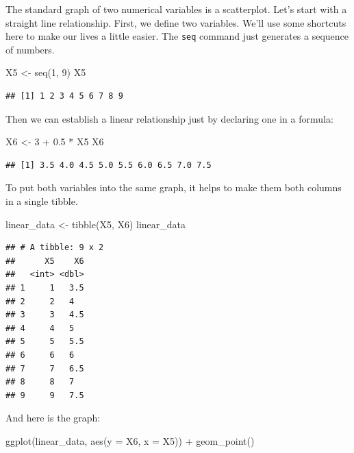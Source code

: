 \documentclass[
]{book}
\newenvironment{Shaded}{\begin{snugshade}}{\end{snugshade}}
\newcommand{\AttributeTok}[1]{\textcolor[rgb]{0.77,0.63,0.00}{#1}}
\newcommand{\DecValTok}[1]{\textcolor[rgb]{0.00,0.00,0.81}{#1}}
\newcommand{\FloatTok}[1]{\textcolor[rgb]{0.00,0.00,0.81}{#1}}
\newcommand{\FunctionTok}[1]{\textcolor[rgb]{0.00,0.00,0.00}{#1}}
\newcommand{\NormalTok}[1]{#1}
\newcommand{\OtherTok}[1]{\textcolor[rgb]{0.56,0.35,0.01}{#1}}
\newcommand{\SpecialCharTok}[1]{\textcolor[rgb]{0.00,0.00,0.00}{#1}}
\begin{document}
The standard graph of two numerical variables is a scatterplot. Let's start with a straight line relationship. First, we define two variables. We'll use some shortcuts here to make our lives a little easier. The \texttt{seq} command just generates a sequence of numbers.

\begin{Shaded}
\begin{Highlighting}[]
\NormalTok{X5 }\OtherTok{\textless{}{-}} \FunctionTok{seq}\NormalTok{(}\DecValTok{1}\NormalTok{, }\DecValTok{9}\NormalTok{)}
\NormalTok{X5}
\end{Highlighting}
\end{Shaded}

\begin{verbatim}
## [1] 1 2 3 4 5 6 7 8 9
\end{verbatim}

Then we can establish a linear relationship just by declaring one in a formula:

\begin{Shaded}
\begin{Highlighting}[]
\NormalTok{X6 }\OtherTok{\textless{}{-}} \DecValTok{3} \SpecialCharTok{+} \FloatTok{0.5} \SpecialCharTok{*}\NormalTok{ X5}
\NormalTok{X6}
\end{Highlighting}
\end{Shaded}

\begin{verbatim}
## [1] 3.5 4.0 4.5 5.0 5.5 6.0 6.5 7.0 7.5
\end{verbatim}

To put both variables into the same graph, it helps to make them both columns in a single tibble.

\begin{Shaded}
\begin{Highlighting}[]
\NormalTok{linear\_data }\OtherTok{\textless{}{-}} \FunctionTok{tibble}\NormalTok{(X5, X6)}
\NormalTok{linear\_data}
\end{Highlighting}
\end{Shaded}

\begin{verbatim}
## # A tibble: 9 x 2
##      X5    X6
##   <int> <dbl>
## 1     1   3.5
## 2     2   4  
## 3     3   4.5
## 4     4   5  
## 5     5   5.5
## 6     6   6  
## 7     7   6.5
## 8     8   7  
## 9     9   7.5
\end{verbatim}

And here is the graph:

\begin{Shaded}
\begin{Highlighting}[]
\FunctionTok{ggplot}\NormalTok{(linear\_data, }\FunctionTok{aes}\NormalTok{(}\AttributeTok{y =}\NormalTok{ X6, }\AttributeTok{x =}\NormalTok{ X5)) }\SpecialCharTok{+}
    \FunctionTok{geom\_point}\NormalTok{()}
\end{Highlighting}
\end{Shaded}
\end{document}
